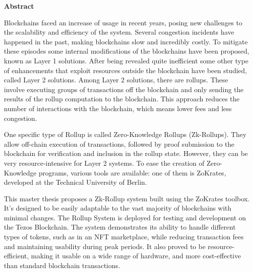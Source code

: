 \thispagestyle{empty}
\vspace*{1.0cm}

\begin{center}
    \textbf{Abstract}
\end{center}

\vspace*{0.5cm}

\noindent
Blockchains faced an increase of usage in recent years, posing new challenges to the scalability and efficiency of the system. Several congestion incidents have happened in the past, making blockchains slow and incredibly costly. To mitigate these episodes some internal modifications of the blockchains have been proposed, known as Layer 1 solutions. After being revealed quite inefficient some other type of enhancements that exploit resources outside the blockchain have been studied, called Layer 2 solutions. Among Layer 2 solutions, there are rollups. These involve executing groups of transactions off the blockchain and only sending the results of the rollup computation to the blockchain. This approach reduces the number of interactions with the blockchain, which means lower fees and less congestion.

One specific type of Rollup is called Zero-Knowledge Rollups (Zk-Rollups). They allow off-chain execution of transactions, followed by proof submission to the blockchain for verification and inclusion in the rollup state. However, they can be very resource-intensive for Layer 2 systems. To ease the creation of Zero-Knowledge programs, various tools are available: one of them is ZoKrates, developed at the Technical University of Berlin.

This master thesis proposes a Zk-Rollup system built using the ZoKrates toolbox. It's designed to be easily adaptable to the vast majority of blockchains with minimal changes. The Rollup System is deployed for testing and development on the Tezos Blockchain. The system demonstrates its ability to handle different types of tokens, such as in an NFT marketplace, while reducing transaction fees and maintaining usability during peak periods. It also proved to be resource-efficient, making it usable on a wide range of hardware, and more cost-effective than standard blockchain transactions.

